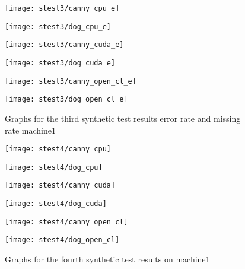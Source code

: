 \begin{figure}[H]
\centering
\begin{minipage}[t]{.49\textwidth}
\centering
\texttt{[image: stest3/canny\_cpu\_e]}
\end{minipage}
\begin{minipage}[t]{.49\textwidth}
\centering
\texttt{[image: stest3/dog\_cpu\_e]}
\end{minipage}
\begin{minipage}[t]{.49\textwidth}
\centering
\texttt{[image: stest3/canny\_cuda\_e]}
\end{minipage}
\begin{minipage}[t]{.49\textwidth}
\centering
\texttt{[image: stest3/dog\_cuda\_e]}
\end{minipage}
\begin{minipage}[t]{.49\textwidth}
\centering
\texttt{[image: stest3/canny\_open\_cl\_e]}
\end{minipage}
\begin{minipage}[t]{.49\textwidth}
\centering
\texttt{[image: stest3/dog\_open\_cl\_e]}
\end{minipage}
\caption{Graphs for the third synthetic test results error rate and missing rate machine1}
\label{fig:test3se}
\end{figure}

\begin{figure}[H]
\centering
\begin{minipage}[t]{.49\textwidth}
\centering
\texttt{[image: stest4/canny\_cpu]}
\end{minipage}
\begin{minipage}[t]{.49\textwidth}
\centering
\texttt{[image: stest4/dog\_cpu]}
\end{minipage}
\begin{minipage}[t]{.49\textwidth}
\centering
\texttt{[image: stest4/canny\_cuda]}
\end{minipage}
\begin{minipage}[t]{.49\textwidth}
\centering
\texttt{[image: stest4/dog\_cuda]}
\end{minipage}
\begin{minipage}[t]{.49\textwidth}
\centering
\texttt{[image: stest4/canny\_open\_cl]}
\end{minipage}
\begin{minipage}[t]{.49\textwidth}
\centering
\texttt{[image: stest4/dog\_open\_cl]}
\end{minipage}
\caption{Graphs for the fourth synthetic test results on machine1}
\label{fig:test4s}
\end{figure}

